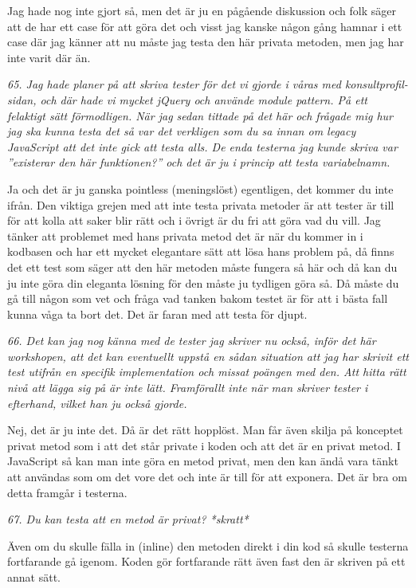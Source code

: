 \documentclass[11pt]{article}
\begin{document}
Jag hade nog inte gjort så, men det är ju en pågående diskussion och folk säger att de har ett case för att göra det och visst jag kanske någon gång hamnar i ett case där jag känner att nu måste jag testa den här privata metoden, men jag har inte varit där än.

\emph{65. Jag hade planer på att skriva tester för det vi gjorde i våras med konsultprofil-sidan, och där hade vi mycket jQuery och använde module pattern. På ett felaktigt sätt förmodligen. När jag sedan tittade på det här och frågade mig hur jag ska kunna testa det så var det verkligen som du sa innan om legacy JavaScript att det inte gick att testa alls. De enda testerna jag kunde skriva var ”existerar den här funktionen?” och det är ju i princip att testa variabelnamn.}

Ja och det är ju ganska pointless (meningslöst) egentligen, det kommer du inte ifrån. Den viktiga grejen med att inte testa privata metoder är att tester är till för att kolla att saker blir rätt och i övrigt är du fri att göra vad du vill. Jag tänker att problemet med hans privata metod det är när du kommer in i kodbasen och har ett mycket elegantare sätt att lösa hans problem på, då finns det ett test som säger att den här metoden måste fungera så här och då kan du ju inte göra din eleganta lösning för den måste ju tydligen göra så. Då måste du gå till någon som vet och fråga vad tanken bakom testet är för att i bästa fall kunna våga ta bort det. Det är faran med att testa för djupt.

\emph{66. Det kan jag nog känna med de tester jag skriver nu också, inför det här workshopen, att det kan eventuellt uppstå en sådan situation att jag har skrivit ett test utifrån en specifik implementation och missat poängen med den. Att hitta rätt nivå att lägga sig på är inte lätt. Framförallt inte när man skriver tester i efterhand, vilket han ju också gjorde.}

Nej, det är ju inte det. Då är det rätt hopplöst. Man får även skilja på konceptet privat metod som i att det står private i koden och att det är en privat metod. I JavaScript så kan man inte göra en metod privat, men den kan ändå vara tänkt att användas som om det vore det och inte är till för att exponera. Det är bra om detta framgår i testerna.

\emph{67. Du kan testa att en metod är privat? *skratt*}

Även om du skulle fälla in (inline) den metoden direkt i din kod så skulle testerna fortfarande gå igenom. Koden gör fortfarande rätt även fast den är skriven på ett annat sätt.
\end{document}

